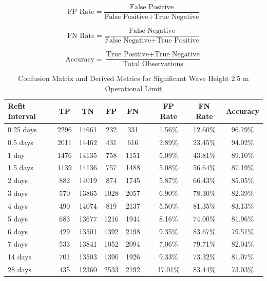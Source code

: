 \begin{equation}
\label{eq:fprate}
\text{FP Rate} = \frac{\text{False Positive}}{\text{False Positive} + \text{True Negative}}
\end{equation}

\begin{equation}
\label{eqfnr}
\text{FN Rate} = \frac{\text{False Negative}}{\text{False Negative} + \text{True Positive}}
\end{equation}

\begin{equation}
\label{eq:accuracy}
\text{Accuracy} = \frac{\text{True Positive} + \text{True Negative}}{\text{Total Observations}}
\end{equation}

\begin{table}[ht!]
    \centering
    \caption{Confusion Matrix and Derived Metrics for Significant Wave Height 2.5 m Operational Limit}
    \label{tab:swh_confusion_derived}
    \begin{tabular}{|l|c|c|c|c|c|c|c|c|}
        \hline
        \textbf{Refit Interval} & \textbf{TP} & \textbf{TN} & \textbf{FP} & \textbf{FN} && \textbf{FP Rate} & \textbf{FN Rate} & \textbf{Accuracy} \\
        \hline
        0.25 days & 2296 & 14661 & 232  & 331  && 1.56\%  & 12.60\% & 96.79\% \\
        0.5 days  & 2011 & 14462 & 431  & 616  && 2.89\%  & 23.45\% & 94.02\% \\
        1 day     & 1476 & 14135 & 758  & 1151 && 5.09\%  & 43.81\% & 89.10\% \\
        1.5 days  & 1139 & 14136 & 757  & 1488 && 5.08\%  & 56.64\% & 87.19\% \\
        2 days    & 882  & 14019 & 874  & 1745 && 5.87\%  & 66.43\% & 85.05\% \\
        3 days    & 570  & 13865 & 1028 & 2057 && 6.90\%  & 78.30\% & 82.39\% \\
        4 days    & 490  & 14074 & 819  & 2137 && 5.50\%  & 81.35\% & 83.13\% \\
        5 days    & 683  & 13677 & 1216 & 1944 && 8.16\%  & 74.00\% & 81.96\% \\
        6 days    & 429  & 13501 & 1392 & 2198 && 9.35\%  & 83.67\% & 79.51\% \\
        7 days    & 533  & 13841 & 1052 & 2094 && 7.06\%  & 79.71\% & 82.04\% \\
        14 days   & 701  & 13503 & 1390 & 1926 && 9.33\%  & 73.32\% & 81.07\% \\
        28 days   & 435  & 12360 & 2533 & 2192 && 17.01\% & 83.44\% & 73.03\% \\
        \hline
    \end{tabular}
\end{table}

